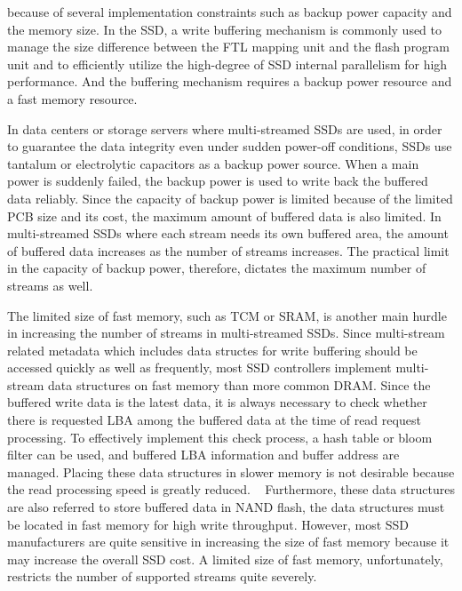 {\color{blue}
because of several implementation constraints such as backup power capacity and the memory size.
In the SSD, a write buffering mechanism is commonly used to manage the size difference 
between the FTL mapping unit and the flash program unit and to efficiently utilize 
the high-degree of SSD internal parallelism for high performance. 
And the buffering mechanism requires a backup power resource and a fast memory resource.

In data centers or storage servers where multi-streamed SSDs are used,
in order to guarantee the data integrity even under sudden power-off conditions, 
SSDs use tantalum or electrolytic capacitors as a backup power source.  
When a main power is suddenly failed, the backup power is used to write back the
buffered data reliably.  
Since the capacity of backup power is limited because of the limited PCB size and 
its cost, the maximum amount of buffered data is also limited.  
In multi-streamed SSDs where
each stream needs its own buffered area, the amount of buffered data increases 
as the number of streams increases.  
The practical limit in the capacity of backup power, therefore, dictates the maximum
number of streams as well.

The limited size of fast memory, such as TCM or SRAM, is another main hurdle in increasing 
the number of streams in multi-streamed SSDs.
Since multi-stream related metadata which includes data structes for write buffering 
should be accessed quickly as well as frequently, 
most SSD controllers implement multi-stream data structures on fast memory than more common DRAM. 
Since the buffered write data is the latest data, 
it is always necessary to check whether there is requested LBA 
among the buffered data at the time of read request processing.
To effectively implement this check process, a hash table or bloom filter can be used, 
and buffered LBA information and buffer address are managed.
Placing these data structures in slower memory is not desirable 
because the read processing speed is greatly reduced.  
Furthermore, these data structures are also referred to store buffered data in NAND flash, 
the data structures must be located in fast memory for high write throughput. 
However, most SSD manufacturers are quite sensitive in increasing the size of 
fast memory because it may increase the overall SSD cost.   
A limited size of fast memory, unfortunately, restricts the number of
supported streams quite severely.
}

